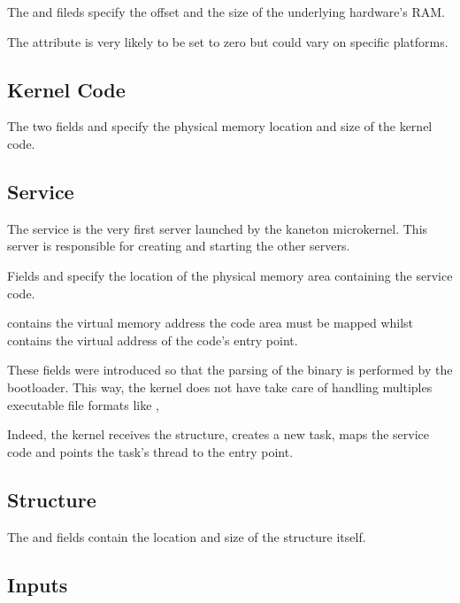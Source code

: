 The  and  fileds specify the offset and the size of
the underlying hardware's RAM.

The  attribute is very likely to be set to zero but could
vary on specific platforms.


\subsection*{Kernel Code}

The two fields  and  specify the physical memory
location and size of the kernel code.


\subsection*{ Service}

The  service is the very first server launched by the kaneton
microkernel. This server is responsible for creating and starting the
other servers.

Fields  and  specify the location of the physical
memory area containing the  service code.

 contains the virtual memory address the code area must
be mapped whilst  contains the virtual address of the code's
entry point.

These fields were introduced so that the parsing of the  binary
is performed by the bootloader. This way, the kernel does not have take
care of handling multiples executable file formats like ,
 \etc{}

Indeed, the kernel receives the  structure, creates a new task,
maps the  service code and points the task's thread to the
entry point.


\subsection*{ Structure}

The  and  fields contain the location and size
of the  structure itself.


\subsection*{Inputs}

